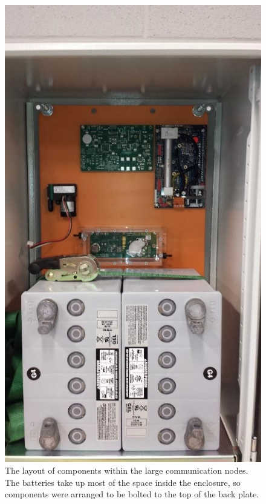 \documentclass[numbook, envcountsect, envcountsame, envcountreset, runningheads, twocolumn]{svjour3}
\begin{document}
		\begin{figure}[!t]
			\centering
				\includegraphics[width=\columnwidth,keepaspectratio]{commbuild1.jpg}
				\caption[Components within the large communication nodes]{The layout of components within the large communication nodes.  The batteries take up most of the space inside the enclosure, so components were arranged to be bolted to the top of the back plate.\label{fig:commbuild1}}
		\end{figure}
		
\end{document}
